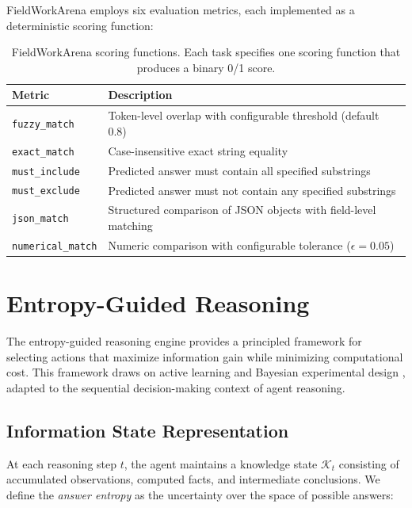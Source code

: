 \documentclass[11pt]{article}
\begin{document}
FieldWorkArena employs six evaluation metrics, each implemented as a deterministic scoring function:

\begin{table}[t]
\centering
\caption{FieldWorkArena scoring functions. Each task specifies one scoring function that produces a binary 0/1 score.}
\label{tab:scoring}
\begin{tabular}{@{}lp{8cm}@{}}
\toprule
\textbf{Metric} & \textbf{Description} \\
\midrule
\texttt{fuzzy\_match}     & Token-level overlap with configurable threshold (default 0.8) \\
\texttt{exact\_match}     & Case-insensitive exact string equality \\
\texttt{must\_include}    & Predicted answer must contain all specified substrings \\
\texttt{must\_exclude}    & Predicted answer must not contain any specified substrings \\
\texttt{json\_match}      & Structured comparison of JSON objects with field-level matching \\
\texttt{numerical\_match} & Numeric comparison with configurable tolerance ($\epsilon = 0.05$) \\
\bottomrule
\end{tabular}
\end{table}

\section{Entropy-Guided Reasoning}
\label{sec:entropy}

The entropy-guided reasoning engine provides a principled framework for selecting actions that maximize information gain while minimizing computational cost. This framework draws on active learning \citep{settles2009active} and Bayesian experimental design \citep{chaloner1995bayesian}, adapted to the sequential decision-making context of agent reasoning.

\subsection{Information State Representation}

At each reasoning step $t$, the agent maintains a knowledge state $\mathcal{K}_t$ consisting of accumulated observations, computed facts, and intermediate conclusions. We define the \emph{answer entropy} as the uncertainty over the space of possible answers:
\end{document}
